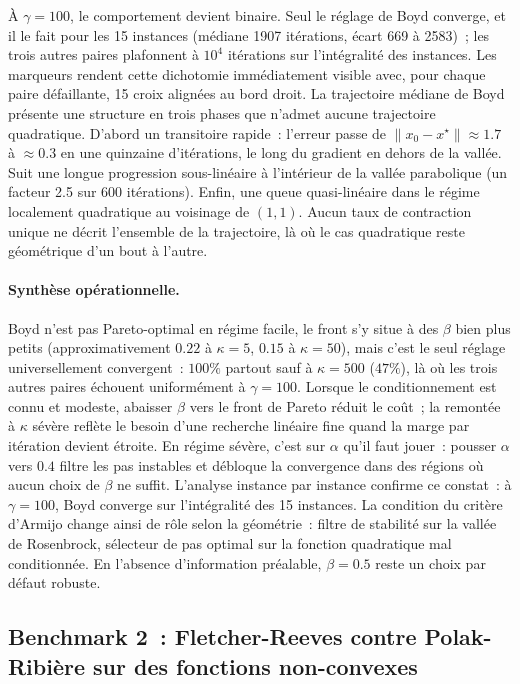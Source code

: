 \documentclass[10pt,a4paper]{article}
\begin{document}
À $\gamma = 100$, le comportement devient binaire. Seul le réglage de Boyd converge, et il le fait pour les 15 instances (médiane 1907 itérations, écart 669 à 2583)~; les trois autres paires plafonnent à $10^4$ itérations sur l'intégralité des instances. Les marqueurs rendent cette dichotomie immédiatement visible avec, pour chaque paire défaillante, 15 croix alignées au bord droit. La trajectoire médiane de Boyd présente une structure en trois phases que n'admet aucune trajectoire quadratique. D'abord un transitoire rapide~: l'erreur passe de $\|x_0 - x^\star\| \approx 1.7$ à $\approx 0.3$ en une quinzaine d'itérations, le long du gradient en dehors de la vallée. Suit une longue progression sous-linéaire à l'intérieur de la vallée parabolique (un facteur 2.5 sur 600 itérations). Enfin, une queue quasi-linéaire dans le régime localement quadratique au voisinage de $(1,1)$. Aucun taux de contraction unique ne décrit l'ensemble de la trajectoire, là où le cas quadratique reste géométrique d'un bout à l'autre.

\paragraph{Synthèse opérationnelle.}
Boyd n'est pas Pareto-optimal en régime facile, le front s'y situe à des $\beta$ bien plus petits (approximativement $0.22$ à $\kappa = 5$, $0.15$ à $\kappa = 50$), mais c'est le seul réglage universellement convergent~: $100\%$ partout sauf à $\kappa = 500$ ($47\%$), là où les trois autres paires échouent uniformément à $\gamma = 100$. Lorsque le conditionnement est connu et modeste, abaisser $\beta$ vers le front de Pareto réduit le coût~; la remontée à $\kappa$ sévère reflète le besoin d'une recherche linéaire fine quand la marge par itération devient étroite. En régime sévère, c'est sur $\alpha$ qu'il faut jouer~: pousser $\alpha$ vers $0.4$ filtre les pas instables et débloque la convergence dans des régions où aucun choix de $\beta$ ne suffit. L'analyse instance par instance confirme ce constat~: à $\gamma = 100$, Boyd converge sur l'intégralité des 15 instances. La condition du critère d'Armijo change ainsi de rôle selon la géométrie~: filtre de stabilité sur la vallée de Rosenbrock, sélecteur de pas optimal sur la fonction quadratique mal conditionnée. En l'absence d'information préalable, $\beta = 0.5$ reste un choix par défaut robuste.

\newpage

\subsection{Benchmark 2~: Fletcher-Reeves contre Polak-Ribière sur des fonctions non-convexes}\label{sec:b2}
\end{document}
